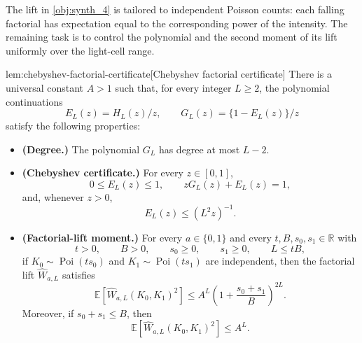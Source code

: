 \documentclass[11pt]{article}
\begin{document}
The lift in \cref{obj:synth_4} is tailored to independent Poisson counts: each falling factorial has expectation equal to the corresponding power of the intensity. The remaining task is to control the polynomial and the second moment of its lift uniformly over the light-cell range.

\begin{lemmav}{lem:chebyshev-factorial-certificate}[Chebyshev factorial certificate]
There is a universal constant \(A>1\) such that, for every integer \(L\ge2\), the polynomial continuations
\[
E_L(z)=H_L(z)/z,
\qquad
G_L(z)=\{1-E_L(z)\}/z
\]
satisfy the following properties:
\begin{itemize}
\item \textbf{(Degree.)} The polynomial \(G_L\) has degree at most \(L-2\).
\item \textbf{(Chebyshev certificate.)} For every \(z\in[0,1]\),
\[
0\le E_L(z)\le 1,
\qquad
zG_L(z)+E_L(z)=1,
\]
and, whenever \(z>0\),
\[
E_L(z)\le (L^2z)^{-1}.
\]
\item \textbf{(Factorial-lift moment.)} For every \(a\in\{0,1\}\) and every \(t,B,s_0,s_1\in\mathbb R\) with
\[
t>0,\qquad B>0,\qquad s_0\ge0,\qquad s_1\ge0,\qquad L\le tB,
\]
if \(K_0\sim\operatorname{Poi}(ts_0)\) and \(K_1\sim\operatorname{Poi}(ts_1)\) are independent, then the factorial lift \(\widehat W_{a,L}\) satisfies
\[
\mathbb E\!\left[\widehat W_{a,L}(K_0,K_1)^2\right]
\le
A^L\left(1+\frac{s_0+s_1}{B}\right)^{2L}.
\]
Moreover, if \(s_0+s_1\le B\), then
\[
\mathbb E\!\left[\widehat W_{a,L}(K_0,K_1)^2\right]\le A^L.
\]
\end{itemize}
\end{lemmav}
\end{document}
